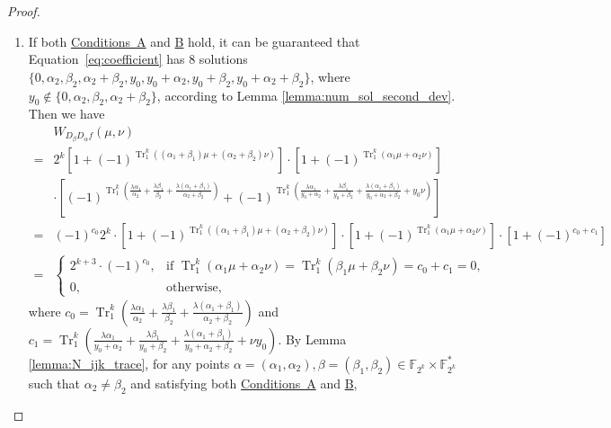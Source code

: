 \documentclass[preprint,10pt]{elsarticle}
\newcommand{\F}{\mathbb{F}}
\newcommand{\0}{\textbf{0}}
\newcommand{\1}{\textbf{1}}
\newcommand{\TRACE}{\operatorname{Tr}_1^k}
\theoremstyle{plain}
\begin{document}
\begin{proof}
\begin{enumerate}[label=\textbf{Case \arabic*},wide = 0pt]
            \item If both \hyperref[item_a]{Conditions~A} and \hyperref[item_b]{B} hold,\label{case_2}
            it can be guaranteed that Equation~\eqref{eq:coefficient} has $8$ solutions $\{0,\alpha_2,\beta_2,\alpha_2+\beta_2,y_0,y_0+\alpha_2,y_0+\beta_2,y_0+\alpha_2+\beta_2\}$, where $y_0\notin\{0,\alpha_2,\beta_2,\alpha_2+\beta_2\}$, according to Lemma \ref{lemma:num_sol_second_dev}.
            Then we have
            \begin{align*}
            &W_{D_{\beta}D_{\alpha}f}(\mu,\nu)\nonumber\\
                =&2^k\left[1+(-1)^{\TRACE\left((\alpha_1+\beta_1)\mu+ (\alpha_2+\beta_2)\nu\right)}\right]\cdot
                \left[1+(-1)^{\TRACE\left(\alpha_1\mu+\alpha_2\nu\right)}\right]\nonumber\\
                &\cdot
                \left[(-1)^{\TRACE\left(\frac{\lambda\alpha_1}{\alpha_2}+\frac{\lambda\beta_1}{\beta_2}+\frac{\lambda(\alpha_1+\beta_1)}{\alpha_2+\beta_2}\right)}+(-1)^{\TRACE\left(\frac{\lambda\alpha_1}{y_0+\alpha_2}+\frac{\lambda\beta_1}{y_0+\beta_2}+\frac{\lambda(\alpha_1+\beta_1)}{y_0+\alpha_2+\beta_2}+ y_0\nu\right)}\right]\nonumber\\
                =&(-1)^{c_0}2^k\cdot\left[1+(-1)^{\TRACE\left((\alpha_1+\beta_1)\mu+ (\alpha_2+\beta_2)\nu\right)}\right]\cdot
                \left[1+(-1)^{\TRACE\left(\alpha_1\mu+\alpha_2\nu\right)}\right]\cdot\left[1+(-1)^{c_0+c_1}\right]\nonumber\\
                =&\begin{cases}
                    2^{k+3}\cdot(-1)^{c_0},&\text{if }\TRACE\left(\alpha_1\mu+\alpha_2\nu\right)=\TRACE\left(\beta_1\mu+\beta_2\nu\right)=c_0+c_1=0,\\
                    0,&\text{otherwise},
                \end{cases}
            \end{align*}
            where
            $c_0=\TRACE\left(\frac{\lambda\alpha_1}{\alpha_2}+\frac{\lambda\beta_1}{\beta_2}+\frac{\lambda(\alpha_1+\beta_1)}{\alpha_2+\beta_2}\right)$
            and
            $c_1= \TRACE\left(\frac{\lambda\alpha_1}{y_0+\alpha_2}+\frac{\lambda\beta_1}{y_0+\beta_2}+\frac{\lambda(\alpha_1+\beta_1)}{y_0+\alpha_2+\beta_2}+\nu y_0\right)$.
            By Lemma \ref{lemma:N_ijk_trace},
            for any points $\alpha=(\alpha_1,\alpha_2),\beta=(\beta_1,\beta_2)\in\F_{2^k}\times\F_{2^k}^*$ such that
            $\alpha_2\ne\beta_2$ and satisfying both \hyperref[item_a]{{Conditions~A}} and \hyperref[item_b]{{B}},

\end{enumerate}
\end{proof}
\end{document}
